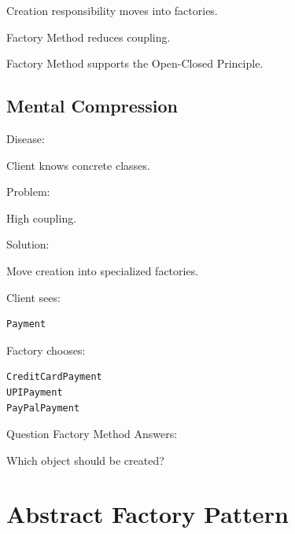 \documentclass[11pt,a4paper]{book}
\begin{document}
\begin{rosettarule}

Creation responsibility moves into factories.

\end{rosettarule}

\begin{rosettarule}

Factory Method reduces coupling.

\end{rosettarule}

\begin{rosettarule}

Factory Method supports the
Open-Closed Principle.

\end{rosettarule}


\section{Mental Compression}

\begin{compressionbox}

Disease:

Client knows concrete classes.

Problem:

High coupling.

Solution:

Move creation into specialized factories.

Client sees:

\begin{verbatim}
Payment
\end{verbatim}

Factory chooses:

\begin{verbatim}
CreditCardPayment
UPIPayment
PayPalPayment
\end{verbatim}

Question Factory Method Answers:

\begin{center}
Which object should be created?
\end{center}

\end{compressionbox}
\chapter{Abstract Factory Pattern}
\end{document}
